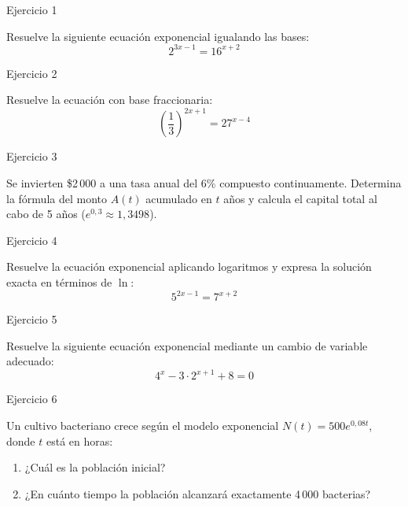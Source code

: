 \documentclass[aspectratio=169]{beamer}
\begin{document}
\begin{frame}{Ejercicio 1}
  \begin{mwejercicio}
    Resuelve la siguiente ecuación exponencial igualando las bases:
    $$2^{3x - 1} = 16^{x + 2}$$
  \end{mwejercicio}
  \vspace{3.5cm}
\end{frame}
\begin{frame}{Ejercicio 2}
  \begin{mwejercicio}
    Resuelve la ecuación con base fraccionaria:
    $$\left(\frac{1}{3}\right)^{2x + 1} = 27^{x - 4}$$
  \end{mwejercicio}
  \vspace{3.5cm}
\end{frame}
\begin{frame}{Ejercicio 3}
  \begin{mwejercicio}
    Se invierten \$2\,000 a una tasa anual del 6\% compuesto continuamente. Determina la fórmula del monto $A(t)$ acumulado en $t$ años y calcula el capital total al cabo de 5 años ($e^{0{,}3} \approx 1{,}3498$).
  \end{mwejercicio}
  \vspace{3.5cm}
\end{frame}
\begin{frame}{Ejercicio 4}
  \begin{mwejercicio}
    Resuelve la ecuación exponencial aplicando logaritmos y expresa la solución exacta en términos de $\ln$:
    $$5^{2x - 1} = 7^{x + 2}$$
  \end{mwejercicio}
  \vspace{3.5cm}
\end{frame}
\begin{frame}{Ejercicio 5}
  \begin{mwejercicio}
    Resuelve la siguiente ecuación exponencial mediante un cambio de variable adecuado:
    $$4^x - 3 \cdot 2^{x + 1} + 8 = 0$$
  \end{mwejercicio}
  \vspace{3.5cm}
\end{frame}
\begin{frame}{Ejercicio 6}
  \begin{mwejercicio}
    Un cultivo bacteriano crece según el modelo exponencial $N(t) = 500 e^{0{,}08 t}$, donde $t$ está en horas:
    \begin{enumerate}
      \item ¿Cuál es la población inicial?
      \item ¿En cuánto tiempo la población alcanzará exactamente 4\,000 bacterias?
    \end{enumerate}
  \end{mwejercicio}
  \vspace{3.5cm}
\end{frame}
\end{document}
